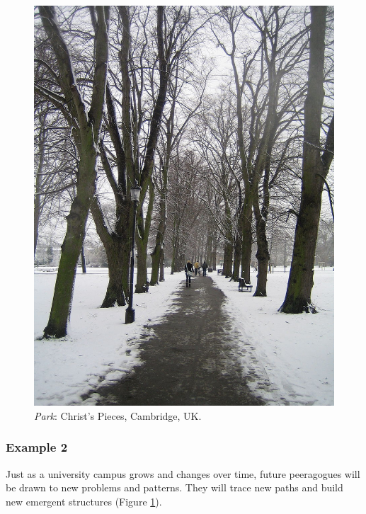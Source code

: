 \begin{figure}
\begin{center}
\includegraphics[width=\textwidth,trim=0 325 0 500, clip=true]{ChristsPieces}
\end{center}
\vspace{-.4cm}
\captionsetup{font=footnotesize,width=.47\textwidth}
\caption{\textsl{Park}: Christ's Pieces, Cambridge, UK.
\label{christs-pieces}}
\end{figure}

\subsubsection*{Example 2} 
Just as a university campus grows and changes over time, future
peeragogues will be drawn to new problems and patterns. They
will trace new paths and build new emergent structures (Figure
\ref{christs-pieces}).


